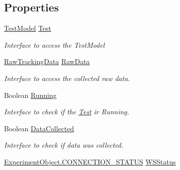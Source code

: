 \subsection*{Properties}
\begin{DoxyCompactItemize}
\item 
\hyperlink{class_web_analyzer_1_1_models_1_1_data_model_1_1_test_model}{Test\+Model} \hyperlink{class_web_analyzer_1_1_controller_1_1_test_controller_afcf9572f80c31e6d9aca33f96e3aaa4f}{Test}
\begin{DoxyCompactList}\small\item\em Interface to access the Test\+Model \end{DoxyCompactList}\item 
\hyperlink{class_web_analyzer_1_1_models_1_1_base_1_1_raw_tracking_data}{Raw\+Tracking\+Data} \hyperlink{class_web_analyzer_1_1_controller_1_1_test_controller_a3ec6bf7552cde054fdffaa8a1a6cf981}{Raw\+Data}
\begin{DoxyCompactList}\small\item\em Interface to access the collected raw data. \end{DoxyCompactList}\item 
Boolean \hyperlink{class_web_analyzer_1_1_controller_1_1_test_controller_a4020785450ade4a26f603d667ce633d6}{Running}
\begin{DoxyCompactList}\small\item\em Interface to check if the \hyperlink{namespace_web_analyzer_1_1_test}{Test} ir Running. \end{DoxyCompactList}\item 
Boolean \hyperlink{class_web_analyzer_1_1_controller_1_1_test_controller_a741cf98b95422a4a307bf8834db147b3}{Data\+Collected}
\begin{DoxyCompactList}\small\item\em Interface to check if data was collected. \end{DoxyCompactList}\item 
\hyperlink{class_web_analyzer_1_1_u_i_1_1_interaction_objects_1_1_experiment_object_a2875208b4f4b0ed643593152f4ec025c}{Experiment\+Object.\+C\+O\+N\+N\+E\+C\+T\+I\+O\+N\+\_\+\+S\+T\+A\+T\+U\+S} \hyperlink{class_web_analyzer_1_1_controller_1_1_test_controller_a1f3032c3be238b03976be19319a64eeb}{W\+S\+Status}

\end{DoxyCompactItemize}
